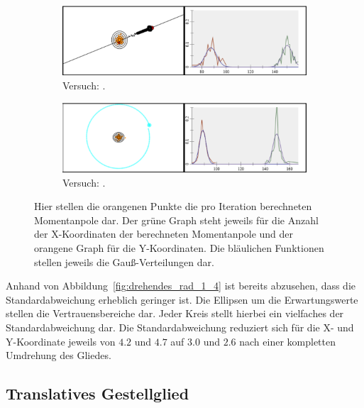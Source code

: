\begin{figure}
    \centering
    \begin{subfigure}[t]{0.45\textwidth}
        \includegraphics[width=\textwidth]{gfx/drehendes_pendel_1.png}
        \caption{Versuch: .}\label{fig:drehendes_pendel_1}
    \end{subfigure}
    \begin{subfigure}[t]{0.45\textwidth}
        \includegraphics[width=\textwidth]{gfx/drehendes_pendel_4.png}
        \caption{Versuch: .}\label{fig:drehendes_pendel_4}
    \end{subfigure}
    \caption{Hier stellen die orangenen Punkte die pro Iteration berechneten Momentanpole dar. Der grüne Graph steht jeweils für die Anzahl der X-Koordinaten der berechneten Momentanpole und der orangene Graph für die Y-Koordinaten. Die bläulichen Funktionen stellen jeweils die Gauß-Verteilungen dar.}
    \label{fig:drehendes_pendel_1_4}
\end{figure}

Anhand von Abbildung~\ref{fig:drehendes_rad_1_4} ist bereits abzusehen, dass die Standardabweichung erheblich geringer ist.
Die Ellipsen um die Erwartungswerte stellen die Vertrauensbereiche dar.
Jeder Kreis stellt hierbei ein vielfaches der Standardabweichung dar.
Die Standardabweichung reduziert sich für die X- und Y-Koordinate jeweils von $4.2$ und $4.7$ auf $3.0$ und $2.6$ nach einer kompletten Umdrehung des Gliedes. 

\subsection{Translatives Gestellglied}

